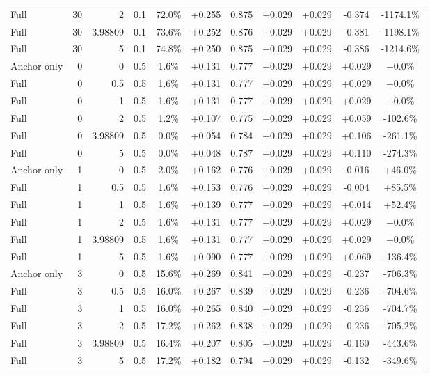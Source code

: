 \begin{table}[htbp]
\begin{tabular}{lrrrccccccc}
Full & 30 & 2 & 0.1 & 72.0\% & +0.255 & 0.875 & +0.029 & +0.029 & -0.374 & -1174.1\% \\
Full & 30 & 3.98809 & 0.1 & 73.6\% & +0.252 & 0.876 & +0.029 & +0.029 & -0.381 & -1198.1\% \\
Full & 30 & 5 & 0.1 & 74.8\% & +0.250 & 0.875 & +0.029 & +0.029 & -0.386 & -1214.6\% \\
Anchor only & 0 & 0 & 0.5 & 1.6\% & +0.131 & 0.777 & +0.029 & +0.029 & +0.029 & +0.0\% \\
Full & 0 & 0.5 & 0.5 & 1.6\% & +0.131 & 0.777 & +0.029 & +0.029 & +0.029 & +0.0\% \\
Full & 0 & 1 & 0.5 & 1.6\% & +0.131 & 0.777 & +0.029 & +0.029 & +0.029 & +0.0\% \\
Full & 0 & 2 & 0.5 & 1.2\% & +0.107 & 0.775 & +0.029 & +0.029 & +0.059 & -102.6\% \\
Full & 0 & 3.98809 & 0.5 & 0.0\% & +0.054 & 0.784 & +0.029 & +0.029 & +0.106 & -261.1\% \\
Full & 0 & 5 & 0.5 & 0.0\% & +0.048 & 0.787 & +0.029 & +0.029 & +0.110 & -274.3\% \\
Anchor only & 1 & 0 & 0.5 & 2.0\% & +0.162 & 0.776 & +0.029 & +0.029 & -0.016 & +46.0\% \\
Full & 1 & 0.5 & 0.5 & 1.6\% & +0.153 & 0.776 & +0.029 & +0.029 & -0.004 & +85.5\% \\
Full & 1 & 1 & 0.5 & 1.6\% & +0.139 & 0.777 & +0.029 & +0.029 & +0.014 & +52.4\% \\
Full & 1 & 2 & 0.5 & 1.6\% & +0.131 & 0.777 & +0.029 & +0.029 & +0.029 & +0.0\% \\
Full & 1 & 3.98809 & 0.5 & 1.6\% & +0.131 & 0.777 & +0.029 & +0.029 & +0.029 & +0.0\% \\
Full & 1 & 5 & 0.5 & 1.6\% & +0.090 & 0.777 & +0.029 & +0.029 & +0.069 & -136.4\% \\
Anchor only & 3 & 0 & 0.5 & 15.6\% & +0.269 & 0.841 & +0.029 & +0.029 & -0.237 & -706.3\% \\
Full & 3 & 0.5 & 0.5 & 16.0\% & +0.267 & 0.839 & +0.029 & +0.029 & -0.236 & -704.6\% \\
Full & 3 & 1 & 0.5 & 16.0\% & +0.265 & 0.840 & +0.029 & +0.029 & -0.236 & -704.7\% \\
Full & 3 & 2 & 0.5 & 17.2\% & +0.262 & 0.838 & +0.029 & +0.029 & -0.236 & -705.2\% \\
Full & 3 & 3.98809 & 0.5 & 16.4\% & +0.207 & 0.805 & +0.029 & +0.029 & -0.160 & -443.6\% \\
Full & 3 & 5 & 0.5 & 17.2\% & +0.182 & 0.794 & +0.029 & +0.029 & -0.132 & -349.6\% \\

\end{tabular}
\end{table}
